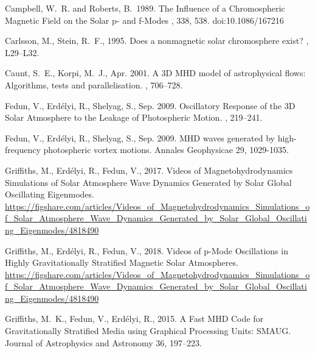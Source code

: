 \documentclass[twocolumn]{aastex62}
\begin{document}
\begin{thebibliography}{}

 {Campbell}, W.~R. and {Roberts}, B.\ 1989. {The Influence of a Chromospheric Magnetic Field on the Solar p- and f-Modes} \apj, 338, 538. doi:10.1086/167216

{Carlsson}, M., {Stein}, R.~F., 1995. {Does a nonmagnetic solar chromosphere
  exist?} , L29--L32.

{Caunt}, S.~E., {Korpi}, M.~J., Apr. 2001. A {3D} {MHD} model of astrophysical
  flows: Algorithms, tests and parallelisation. , 706--728.

{Fedun}, V., {Erd{\'e}lyi}, R., {Shelyag}, S., Sep. 2009. {Oscillatory Response
  of the 3D Solar Atmosphere to the Leakage of Photospheric Motion}. , 219--241.

{Fedun}, V., {Erd{\'e}lyi}, R., {Shelyag}, S., Sep. 2009. {MHD waves generated by high-frequency photospheric vortex motions}. Annales Geophysicae
  29, 1029-1035.

{Griffiths}, M., {Erd{\'e}lyi}, R., {Fedun}, V., 2017. {Videos of
  Magnetohydrodynamics Simulations of Solar Atmosphere Wave Dynamics Generated
  by Solar Global Oscillating Eigenmodes}.
\newline \url{https://figshare.com/articles/Videos_of_Magnetohydrodynamics_Simulations_of_Solar_Atmosphere_Wave_Dynamics_Generated_by_Solar_Global_Oscillating_Eigenmodes/4818490}

{Griffiths}, M., {Erd{\'e}lyi}, R., {Fedun}, V., 2018. {Videos of p-Mode Oscillations in Highly Gravitationally Stratified Magnetic Solar Atmospheres}.
\newline \url{https://figshare.com/articles/Videos_of_Magnetohydrodynamics_Simulations_of_Solar_Atmosphere_Wave_Dynamics_Generated_by_Solar_Global_Oscillating_Eigenmodes/4818490}

{Griffiths}, M.~K., {Fedun}, V., {Erd{\'e}lyi}, R., 2015. {A Fast MHD Code for
  Gravitationally Stratified Media using Graphical Processing Units: SMAUG}.
  Journal of Astrophysics and Astronomy 36, 197--223.



\end{thebibliography}
\end{document}
